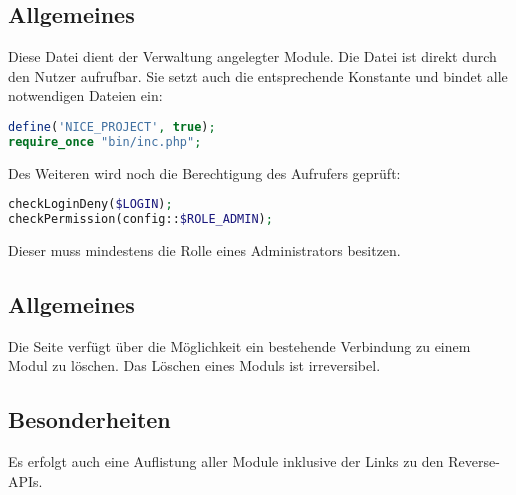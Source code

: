 \subsection{Allgemeines} Diese Datei dient der Verwaltung angelegter Module.
Die Datei ist direkt durch den Nutzer aufrufbar. Sie setzt auch die entsprechende Konstante und bindet alle notwendigen Dateien ein:
\begin{lstlisting}[language=php]
define('NICE_PROJECT', true);
require_once "bin/inc.php";
\end{lstlisting}
Des Weiteren wird noch die Berechtigung des Aufrufers geprüft:
\begin{lstlisting}[language=php]
checkLoginDeny($LOGIN);
checkPermission(config::$ROLE_ADMIN);
\end{lstlisting}
Dieser muss mindestens die Rolle eines Administrators besitzen.
\subsection{Allgemeines}
Die Seite verfügt über die Möglichkeit ein bestehende Verbindung zu einem Modul zu löschen. Das Löschen eines Moduls ist irreversibel.
\subsection{Besonderheiten}
Es erfolgt auch eine Auflistung aller Module inklusive der Links zu den Reverse-APIs.
